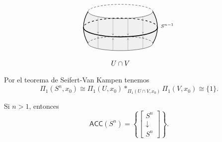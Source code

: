 \begin{dem}
\[\begin{tikzpicture}[scale=0.95, >=stealth]
    \begin{scope}[shift={(5.6, 0)}]
        \fill[gray!12] (-1.732, 0.85) arc (180:360:1.732 and 0.38)
            .. controls (2.05, 0.3) and (2.05, -0.3) .. (1.732, -0.85)
            arc (360:180:1.732 and 0.38)
            .. controls (-2.05, -0.3) and (-2.05, 0.3) .. (-1.732, 0.85);

        \draw[thick] (-1.732, 0.85) .. controls (-2.06, 0.3) and (-2.06, -0.3) .. (-1.732, -0.85);
        \draw[thick] (1.732, 0.85) .. controls (2.06, 0.3) and (2.06, -0.3) .. (1.732, -0.85);

        \draw[densely dashed, thin] (1.732, 0.85) arc (0:180:1.732 and 0.38);
        \draw[thin] (-1.732, 0.85) arc (180:360:1.732 and 0.38);
        \draw[densely dashed, thin] (1.732, -0.85) arc (0:180:1.732 and 0.38);
        \draw[thin] (-1.732, -0.85) arc (180:360:1.732 and 0.38);

        \foreach \x/\ytop/\ymid/\ybot in {
            -1.2/0.58/-0.40/-1.12,
            -0.4/0.48/-0.49/-1.22,
             0.4/0.48/-0.49/-1.22,
             1.2/0.58/-0.40/-1.12
        } {
            \draw[->, thin, gray!85] (\x, \ytop) -- (\x, {\ymid + 0.06});
            \draw[->, thin, gray!85] (\x, \ybot) -- (\x, {\ymid - 0.06});
        }

        \draw[dashed, thick] (1.98, 0) arc (0:180:1.98 and 0.5);
        \draw[very thick] (-1.98, 0) arc (180:360:1.98 and 0.5);

        \node[right] at (2.02, 0.1) {$\scriptstyle S^{n-1}$};
        \node at (0, -1.9) {$U \cap V$};
    \end{scope}
\end{tikzpicture}
\]
Por el teorema de Seifert-Van Kampen tenemos
\[
\Pi_1(S^n, x_0) \cong \Pi_1(U, x_0) {\ast}_{\Pi_1(U \cap V, x_0)} \Pi_1(V, x_0) \cong \{1\}.
\]
\end{dem}

\begin{coro}
Si $n > 1$, entonces
\[
\mathsf{ACC}(S^n) = \left\{ \left[ \begin{smallmatrix} S^n \\ \downarrow \\ S^n \end{smallmatrix} \right] \right\}.
\]
\end{coro}

